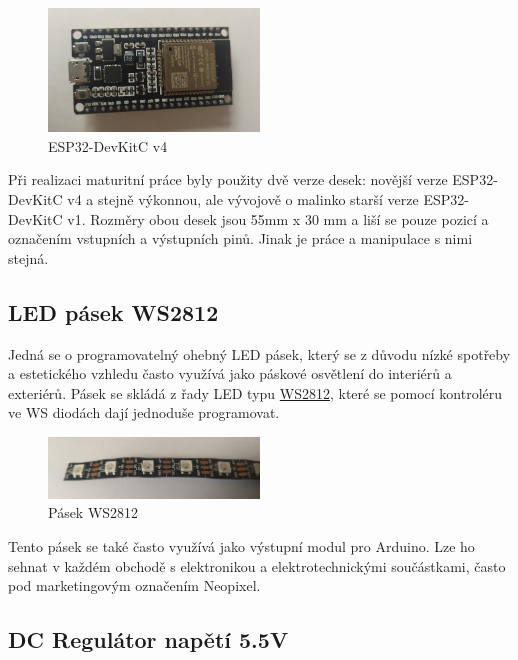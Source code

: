 \begin{figure}[htbp]
	\centering
	\includegraphics[width=0.5\textwidth]{img/02 ele/ESPDevKit3.jpg}
	\caption{ESP32-DevKitC v4}
\end{figure}

Při realizaci maturitní práce byly použity dvě verze desek: novější verze ESP32-DevKitC v4 a stejně výkonnou, ale vývojově o malinko starší verze ESP32-DevKitC v1. Rozměry obou desek jsou 55mm x 30 mm a liší se pouze pozicí a označením vstupních a výstupních pinů. Jinak je práce a manipulace s nimi stejná. 

\subsection{LED pásek WS2812}

Jedná se o programovatelný ohebný LED pásek, který se z důvodu nízké spotřeby a estetického vzhledu často využívá jako páskové osvětlení do interiérů a exteriérů. Pásek se skládá z řady LED typu \href{https://www.arduino.cc}{WS2812}, které se pomocí kontroléru ve WS diodách dají jednoduše programovat. 

\begin{figure}[htbp]
	\centering
	\includegraphics[width=0.5\textwidth]{img/02 ele/OhebnyLedPasek2.jpg}
	\caption{Pásek WS2812}
\end{figure}

Tento pásek se také často využívá jako výstupní modul pro Arduino. Lze ho sehnat v každém obchodě s elektronikou a elektrotechnickými součástkami, často pod marketingovým označením Neopixel. 

\subsection{DC Regulátor napětí 5.5V}

